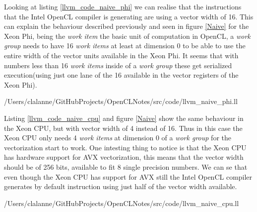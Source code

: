 \par{Looking at listing \ref{llvm_code_naive_phi} we can realise that the 
    instructions that the Intel OpenCL compiler is generating are using a vector
    width of 16. This can explain the behaviour described previously and seen in
    figure \ref{Naive} for the Xeon Phi, being the \emph{work item} the basic 
    unit of computation in OpenCL, a \emph{work group} needs to have 16 \emph{
    work items} at least at dimension 0 to be able to use the entire width
    of the vector units available in the Xeon Phi. It seems that with numbers 
    less than 16 \emph{work items} inside of a \emph{work group} these 
    get serialized execution(using just one lane of the 16 available in the 
    vector registers of the Xeon Phi).}


    {/Users/clalanne/GitHubProjects/OpenCLNotes/src/code/llvm_naive_phi.ll}

\par{Listing \ref{llvm_code_naive_cpu} and figure \ref{Naive} show the same 
    behaviour in the Xeon CPU, but with vector width of 4 instead of 16. Thus 
    in this case the Xeon CPU only needs 4 \emph{work items} at dimension 0
    of a \emph{work group} for the vectorization start to work. One intesting
    thing to notice is that the Xeon CPU has hardware support for AVX 
    vectorization, this means that the vector width should be of 256 bits, 
    available to fit 8 single precision numbers. We can se that even though 
    the Xeon CPU has support for AVX still the Intel OpenCL compiler generates
    by default instruction using just half of the vector width available.}


    {/Users/clalanne/GitHubProjects/OpenCLNotes/src/code/llvm_naive_cpu.ll}

